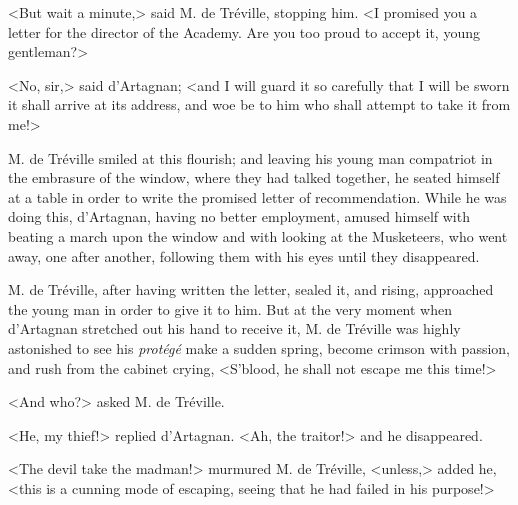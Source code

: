 <But wait a minute,> said M. de Tréville, stopping him. <I promised you a letter for the director of the Academy. Are you too proud to accept it, young gentleman?> 

<No, sir,> said d'Artagnan; <and I will guard it so carefully that I will be sworn it shall arrive at its address, and woe be to him who shall attempt to take it from me!> 

M. de Tréville smiled at this flourish; and leaving his young man compatriot in the embrasure of the window, where they had talked together, he seated himself at a table in order to write the promised letter of recommendation. While he was doing this, d'Artagnan, having no better employment, amused himself with beating a march upon the window and with looking at the Musketeers, who went away, one after another, following them with his eyes until they disappeared. 

M. de Tréville, after having written the letter, sealed it, and rising, approached the young man in order to give it to him. But at the very moment when d'Artagnan stretched out his hand to receive it, M. de Tréville was highly astonished to see his \textit{protégé} make a sudden spring, become crimson with passion, and rush from the cabinet crying, <S'blood, he shall not escape me this time!> 

<And who?> asked M. de Tréville. 

<He, my thief!> replied d'Artagnan. <Ah, the traitor!> and he disappeared. 

<The devil take the madman!> murmured M. de Tréville, <unless,> added he, <this is a cunning mode of escaping, seeing that he had failed in his purpose!> 